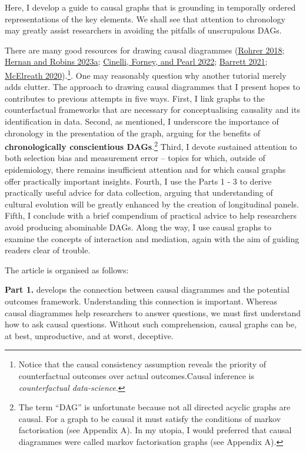 \documentclass[
  singlecolumn]{report}
\begin{document}
Here, I develop a guide to causal graphs that is grounding in temporally
ordered representations of the key elements. We shall see that attention
to chronology may greatly assist researchers in avoiding the pitfalls of
unscrupulous DAGs.

There are many good resources for drawing causal diagrammes
(\protect\hyperlink{ref-rohrer2018}{Rohrer 2018};
\protect\hyperlink{ref-hernan2023}{Hernan and Robins 2023a};
\protect\hyperlink{ref-cinelli2022}{Cinelli, Forney, and Pearl 2022};
\protect\hyperlink{ref-barrett2021}{Barrett 2021};
\protect\hyperlink{ref-mcelreath2020}{McElreath 2020}).\footnote{Notice
  that the causal consistency assumption reveals the priority of
  counterfactual outcomes over actual outcomes.Causal inference is
  \emph{counterfactual data-science}.}. One may reasonably question why
another tutorial merely adds clutter. The approach to drawing causal
diagrammes that I present hopes to contributes to previous attempts in
five ways. First, I link graphs to the counterfactual frameworks that
are necessary for conceptualising causality and its identification in
data. Second, as mentioned, I underscore the importance of chronology in
the presentation of the graph, arguing for the benefits of
\textbf{chronologically conscientious DAGs}.\footnote{The term ``DAG''
  is unfortunate because not all directed acyclic graphs are causal. For
  a graph to be causal it must satisfy the conditions of markov
  factorisation (see Appendix A). In my utopia, I would preferred that
  causal diagrammes were called markov factorisation graphs (see
  Appendix A).} Third, I devote sustained attention to both selection
bias and measurement error -- topics for which, outside of epidemiology,
there remains insufficient attention and for which causal graphs offer
practically important insights. Fourth, I use the Parts 1 - 3 to derive
practically useful advice for data collection, arguing that
understanding of cultural evolution will be greatly enhanced by the
creation of longitudinal panels. Fifth, I conclude with a brief
compendium of practical advice to help researchers avoid producing
abominable DAGs. Along the way, I use causal graphs to examine the
concepts of interaction and mediation, again with the aim of guiding
readers clear of trouble.

The article is organised as follows:

\textbf{Part 1.} develops the connection between causal diagrammes and
the potential outcomes framework. Understanding this connection is
important. Whereas causal diagrammes help researchers to answer
questions, we must first understand how to ask causal questions. Without
such comprehension, causal graphs can be, at best, unproductive, and at
worst, deceptive.
\end{document}
